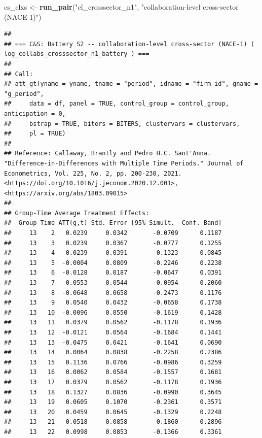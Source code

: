 \documentclass[
]{article}
\newenvironment{Shaded}{\begin{snugshade}}{\end{snugshade}}
\newcommand{\FunctionTok}[1]{\textcolor[rgb]{0.13,0.29,0.53}{\textbf{#1}}}
\newcommand{\NormalTok}[1]{#1}
\newcommand{\OtherTok}[1]{\textcolor[rgb]{0.56,0.35,0.01}{#1}}
\newcommand{\StringTok}[1]{\textcolor[rgb]{0.31,0.60,0.02}{#1}}
\begin{document}
\begin{Shaded}
\begin{Highlighting}[]
\NormalTok{cs\_clxs }\OtherTok{\textless{}{-}} \FunctionTok{run\_pair}\NormalTok{(}\StringTok{"cl\_crosssector\_n1"}\NormalTok{,  }\StringTok{"collaboration{-}level cross{-}sector (NACE{-}1)"}\NormalTok{)}
\end{Highlighting}
\end{Shaded}

\begin{verbatim}
## 
## === C&S: Battery S2 -- collaboration-level cross-sector (NACE-1) ( log_collabs_crosssector_n1_battery ) ===
## 
## Call:
## att_gt(yname = yname, tname = "period", idname = "firm_id", gname = "g_period", 
##     data = df, panel = TRUE, control_group = control_group, anticipation = 0, 
##     bstrap = TRUE, biters = BITERS, clustervars = clustervars, 
##     pl = TRUE)
## 
## Reference: Callaway, Brantly and Pedro H.C. Sant'Anna.  "Difference-in-Differences with Multiple Time Periods." Journal of Econometrics, Vol. 225, No. 2, pp. 200-230, 2021. <https://doi.org/10.1016/j.jeconom.2020.12.001>, <https://arxiv.org/abs/1803.09015> 
## 
## Group-Time Average Treatment Effects:
##  Group Time ATT(g,t) Std. Error [95% Simult.  Conf. Band]  
##     13    2   0.0239     0.0342       -0.0709      0.1187  
##     13    3   0.0239     0.0367       -0.0777      0.1255  
##     13    4  -0.0239     0.0391       -0.1323      0.0845  
##     13    5  -0.0004     0.0809       -0.2246      0.2238  
##     13    6  -0.0128     0.0187       -0.0647      0.0391  
##     13    7   0.0553     0.0544       -0.0954      0.2060  
##     13    8  -0.0648     0.0658       -0.2473      0.1176  
##     13    9   0.0540     0.0432       -0.0658      0.1738  
##     13   10  -0.0096     0.0550       -0.1619      0.1428  
##     13   11   0.0379     0.0562       -0.1178      0.1936  
##     13   12  -0.0121     0.0564       -0.1684      0.1441  
##     13   13  -0.0475     0.0421       -0.1641      0.0690  
##     13   14   0.0064     0.0838       -0.2258      0.2386  
##     13   15   0.1136     0.0766       -0.0986      0.3259  
##     13   16   0.0062     0.0584       -0.1557      0.1681  
##     13   17   0.0379     0.0562       -0.1178      0.1936  
##     13   18   0.1327     0.0836       -0.0990      0.3645  
##     13   19   0.0605     0.1070       -0.2361      0.3571  
##     13   20   0.0459     0.0645       -0.1329      0.2248  
##     13   21   0.0518     0.0858       -0.1860      0.2896  
##     13   22   0.0998     0.0853       -0.1366      0.3361  

\end{verbatim}
\end{document}
